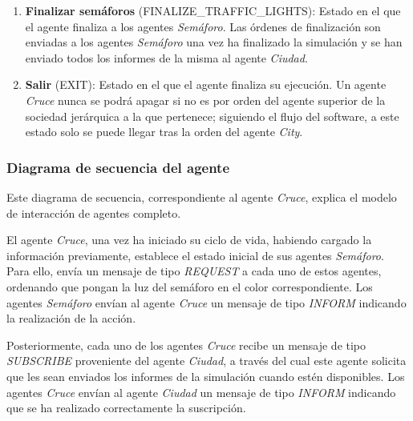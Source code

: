 \begin{enumerate}
    \item \textbf{Finalizar semáforos} \footnotesize(FINALIZE\_TRAFFIC\_LIGHTS)\normalsize: Estado en el que el agente finaliza a los agentes \textit{Semáforo}. Las órdenes de finalización son enviadas a los agentes \textit{Semáforo} una vez ha finalizado la simulación y se han enviado todos los informes de la misma al agente \textit{Ciudad}.
    \item \textbf{Salir} \footnotesize(EXIT)\normalsize: Estado en el que el agente finaliza su ejecución. Un agente \textit{Cruce} nunca se podrá apagar si no es por orden del agente superior de la sociedad jerárquica a la que pertenece; siguiendo el flujo del software, a este estado solo se puede llegar tras la orden del agente \textit{City}.
\end{enumerate}

\newpage
\subsubsection{Diagrama de secuencia del agente}
Este diagrama de secuencia, correspondiente al agente \textit{Cruce}, explica el modelo de interacción de agentes completo.

El agente \textit{Cruce}, una vez ha iniciado su ciclo de vida, habiendo cargado la información previamente, establece el estado inicial de sus agentes \textit{Semáforo}. Para ello, envía un mensaje de tipo \textit{REQUEST} a cada uno de estos agentes, ordenando que pongan la luz del semáforo en el color correspondiente. Los agentes \textit{Semáforo} envían al agente \textit{Cruce} un mensaje de tipo \textit{INFORM} indicando la realización de la acción.

Posteriormente, cada uno de los agentes \textit{Cruce} recibe un mensaje de tipo \textit{SUBSCRIBE} proveniente del agente \textit{Ciudad}, a través del cual este agente solicita que les sean enviados los informes de la simulación cuando estén disponibles. Los agentes \textit{Cruce} envían al agente \textit{Ciudad} un mensaje de tipo \textit{INFORM} indicando que se ha realizado correctamente la suscripción.

